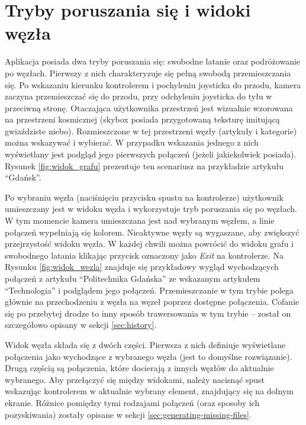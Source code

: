 \section{Tryby poruszania się i widoki węzła}
\label{sec:tryby-widoki}
Aplikacja posiada dwa tryby poruszania się: swobodne latanie oraz podróżowanie po węzłach. Pierwszy z nich charakteryzuje się pełną swobodą przemieszczania się. Po wskazaniu kierunku kontrolerem i pochyleniu joysticka do przodu, kamera zaczyna przemieszczać się do przodu, przy odchyleniu joysticka do tyłu w przeciwną stronę. Otaczająca użytkownika przestrzeń jest wizualnie wzorowana na przestrzeni kosmicznej (skybox posiada przygotowaną teksturę imitującą gwiaździste niebo). Rozmieszczone w tej przestrzeni węzły (artykuły i kategorie) można wskazywać i wybierać. W przypadku wskazania jednego z nich wyświetlany jest podgląd jego pierwszych połączeń (jeżeli jakiekolwiek posiada). Rysunek \ref{fig:widok_grafu} prezentuje ten scenariusz na przykładzie artykułu ``Gdańsk''.


Po wybraniu węzła (naciśnięciu przycisku spustu na kontrolerze) użytkownik umieszczany jest w widoku węzła i wykorzystuje tryb poruszania się po węzłach. W tym momencie kamera umieszczana jest nad wybranym węzłem, a linie połączeń wypełniają się kolorem. Nieaktywne węzły są wygaszane, aby zwiększyć przejrzystość widoku węzła. W każdej chwili można powrócić do widoku grafu i swobodnego latania klikając przycisk oznaczony jako \textit{Exit} na kontrolerze. Na Rysunku \ref{fig:widok_wezla} znajduje się przykładowy wygląd wychodzących połączeń z artykułu ``Politechnika Gdańska'' ze wskazanym artykułem ``Technologia'' i podglądem jego połączeń. Przemieszczanie w tym trybie polega głównie na przechodzeniu z węzła na węzeł poprzez dostępne połączenia. Cofanie się po przebytej drodze to inny sposób trawersowania w tym trybie – został on szczegółowo opisany w sekcji \ref{sec:history}.


Widok węzła składa się z dwóch części. Pierwsza z nich definiuje wyświetlane połączenia jako wychodzące z wybranego węzła (jest to domyślne rozwiązanie). Drugą częścią są połączenia, które docierają z innych węzłów do aktualnie wybranego. Aby przełączyć się między widokami, należy nacisnąć spust wskazując kontrolerem w aktualnie wybrany element, znajdujący się na dolnym ekranie. Różnice pomiędzy tymi rodzajami połączeń (oraz sposoby ich pozyskiwania) zostały opisane w sekcji \ref{sec:generating-missing-files}.